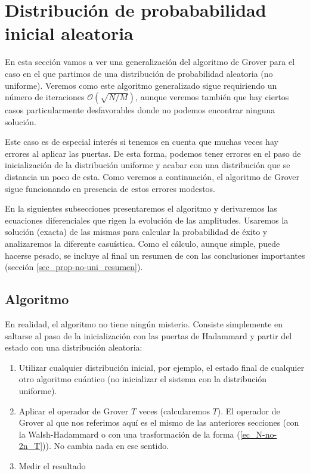 \documentclass[a4paper,11pt]{article} %
\numberwithin{equation}{section}
\begin{document}




\newpage
\section{Distribución de probababilidad inicial aleatoria} \label{sec_arbitrary_distribition}

En esta sección vamos a ver una generalización del algoritmo de Grover para el caso en el que partimos de una distribución de probabilidad aleatoria (no uniforme). Veremos como este algoritmo generalizado sigue requiriendo un número de iteraciones $\mathcal{O}(\sqrt{N/M})$, aunque veremos también que hay ciertos casos particularmente desfavorables donde no podemos encontrar ninguna solución. 


Este caso es de especial interés si tenemos en cuenta que muchas veces hay errores al aplicar las puertas. De esta forma, podemos tener errores en el paso de inicialización de la distribución uniforme y acabar con una distribución que se distancia un poco de esta. Como veremos a continuación, el algoritmo de Grover sigue funcionando en presencia de estos errores modestos.

En la siguientes subsecciones presentaremos el algoritmo y derivaremos las ecuaciones diferenciales que rigen la evolución de las amplitudes. Usaremos la solución (exacta) de las mismas para calcular la probabilidad de éxito y analizaremos la diferente casuística. Como el cálculo, aunque simple, puede hacerse pesado, se incluye al final un resumen de con las conclusiones importantes (sección \ref{sec_prop-no-uni_resumen}).

\subsection{Algoritmo}

En realidad, el algoritmo no tiene ningún misterio. Consiste simplemente en saltarse al paso de la inicialización con las puertas de Hadammard y partir del estado con una distribución aleatoria:

\begin{enumerate}
	\item Utilizar cualquier distribución inicial, por ejemplo, el estado final de cualquier otro algoritmo cuántico (no inicializar el sistema con la distribución uniforme).
	
	\item Aplicar el operador de Grover $T$ veces (calcularemos $T$). El operador de Grover al que nos referimos aquí es el mismo de las anteriores secciones (con la Walsh-Hadammard o con una trasformación de la forma (\ref{ec_N-no-2n_T})). No cambia nada en ese sentido.
	
	\item Medir el resultado
\end{enumerate}
\end{document}
